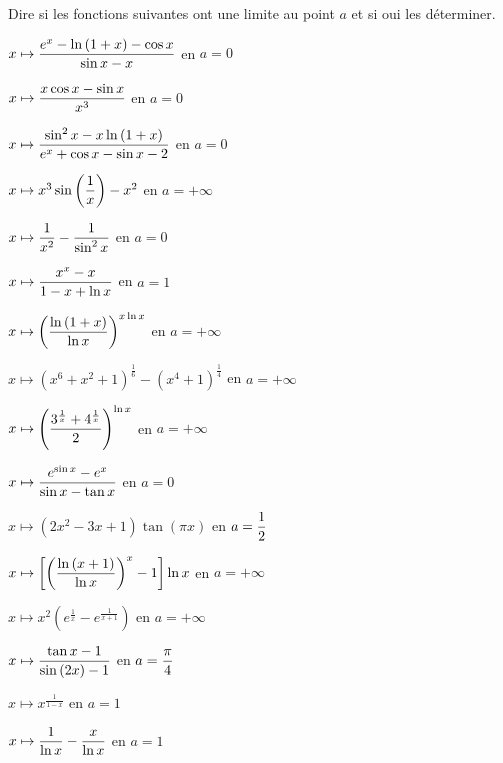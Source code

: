 \documentclass[a4paper, 11pt,reqno]{article}
\begin{document}
\begin{exercice}  \;
	Dire si les fonctions suivantes ont une limite au point $a$ et si oui les d\'eterminer.
	\begin{enumerate}
		\begin{minipage}[t]{0.45\textwidth}
			\item $x\mapsto \displaystyle\frac{e^x-\ln{(1+x)} -\cos{x}  }{\sin{x}-x}$ en $a=0$ \vsec
			\item $x\mapsto \displaystyle\frac{x\cos{x} -\sin{x} }{x^3}$ en $a=0$ \vsec
			\item $x\mapsto \displaystyle\frac{\sin^2{x}-x\ln{(1+x)}   }{e^x+\cos{x}-\sin{x}-2  }$ en $a=0$ \vsec
			\item $x\mapsto x^3\sin{\left(\displaystyle\frac{1}{x} \right)}-x^2$ en $a=+\infty$ \vsec
			\item $x\mapsto \displaystyle\frac{1}{x^2}-\displaystyle\frac{1}{\sin^2{x}}$ en $a=0$ \vsec
			\item $x\mapsto \displaystyle\frac{x^x-x}{1-x+\ln{x}}$ en $a=1$ \vsec
			\item $x\mapsto \left(  \displaystyle\frac{\ln{(1+x)}}{\ln{x}}\right)^{x\ln{x}}$ en $a=+\infty$ \vsec
			\item $x\mapsto (x^6+x^2+1)^{\frac{1}{6}}-(x^4+1)^{\frac{1}{4}}$ en $a=+\infty$ \vsec
		\end{minipage}
		\begin{minipage}[t]{0.45\textwidth}
			\item $x\mapsto \left( \displaystyle\frac{3^{\frac{1}{x}}  +4^{\frac{1}{x}} }{2} \right)^{\ln{x}}$ en $a=+\infty$ \vsec
			\item $x\mapsto \displaystyle\frac{e^{\sin{x}} -e^x  }{\sin{x}-\tan{x}}$ en $a=0$ \vsec
			\item $x\mapsto (2x^2-3x+1)\tan{(\pi x)}$ en $a=\displaystyle\frac{1}{2}$ \vsec
			\item $x\mapsto \left\lbrack \left( \displaystyle\frac{\ln{(x+1)}}{\ln{x}}   \right)^x -1\right\rbrack \ln{x}$ en $a=+\infty$ \vsec
			\item $x\mapsto x^2\left( e^{\frac{1}{x}}-e^{\frac{1}{x+1}} \right)$ en $a=+\infty$ \vsec
			\item $x\mapsto \displaystyle\frac{\tan{x}-1}{\sin{(2x)} -1}$ en $a=\displaystyle\frac{\pi}{4}$ \vsec
			\item $x\mapsto x^{\frac{1}{1-x}}$ en $a=1$ \vsec
			\item $x\mapsto \displaystyle\frac{1}{\ln{x}}- \displaystyle\frac{x}{\ln{x}}$ en $a=1$ \vsec
		\end{minipage}
	\end{enumerate}
\end{exercice}
\end{document}
